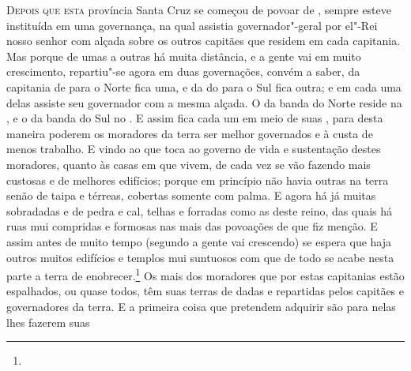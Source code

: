 \noindent\textsc{Depois que esta} província Santa Cruz se começou de povoar de    %
, sempre esteve instituída em uma governança, na qual
assistia governador"-geral por el"-Rei nosso senhor com alçada sobre os		  %
outros capitães que residem em cada capitania. Mas  porque de umas a
outras há muita distância, e a gente vai em muito crescimento,
repartiu"-se agora em duas governações, convém a saber, da capitania de
 para o Norte fica uma, e da do  para o Sul
fica outra; e em cada uma delas assiste seu governador com a mesma
alçada. O da banda do Norte reside na , e o da
banda do Sul no . E assim fica cada um em meio de suas
, para desta maneira poderem os moradores da terra ser melhor
governados e à custa de menos trabalho.
E vindo ao que toca ao governo de vida e sustentação destes
moradores, quanto às casas em que vivem, de cada vez se vão fazendo mais
custosas e de melhores edifícios; porque em princípio não havia outras
na terra senão de taipa e térreas, cobertas somente com palma. E agora				%
há já muitas sobradadas e de pedra e cal, telhas e forradas como as				%
deste reino, das quais há ruas mui compridas e formosas nas mais das				%
povoações de que fiz menção. E assim antes de muito tempo (segundo a
gente vai crescendo) se espera que haja outros muitos edifícios e
templos mui suntuosos com que de todo se acabe nesta parte a terra de
enobrecer.\footnote{}
Os mais dos moradores que por estas capitanias estão
espalhados, ou quase todos, têm suas terras de  dadas e
repartidas pelos capitães e governadores da terra. E a primeira coisa
que pretendem adquirir são  para nelas lhes fazerem suas \EP[-2]

